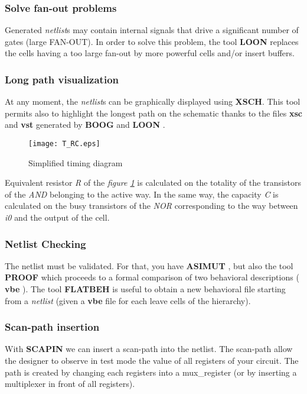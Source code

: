 \documentclass{article}
\begin{document}
{\subsubsection{Solve fan-out problems }
    Generated { \it netlist}\/s may contain internal signals that drive a
    significant number of gates (large FAN-OUT).
    In order to solve this problem, the tool
    { \bf LOON } replaces the cells having a too large fan-out by more powerful
    cells and/or insert buffers.

\subsubsection{Long path visualization }
    At any moment, the { \it netlist}\/s can be graphically displayed using {\bf XSCH}.
This tool permits also to highlight the longest path on the schematic thanks to the files { \bf
xsc } and { \bf vst } generated by { \bf BOOG } and { \bf LOON }.

\begin{figure}[H]\centering
  \texttt{[image: T\_RC.eps]}
 \caption{Simplified timing diagram }
  \label{Fig:T_RC}
\end{figure}

Equivalent resistor { \it R } of the { \it figure \ref{Fig:T_RC} }
is calculated on the totality of the transistors of the { \it AND
} belonging to the active way. In the same way, the capacity { \it
C } is calculated on the busy transistors of the { \it NOR }
corresponding to the way between { \it i0 } and the output of the
cell.

\subsubsection{Netlist Checking}
    The netlist must be validated. For that, you have { \bf ASIMUT },
    but also the tool { \bf PROOF } which proceeds to a formal comparison of two behavioral
    descriptions ({ \bf vbe }). The tool { \bf FLATBEH } is useful to obtain a
    new behavioral file starting from a { \it netlist } 
   (given a {\bf vbe} file for each leave cells of the hierarchy).

\subsubsection{Scan-path insertion}
    With { \bf SCAPIN } we can insert a scan-path into the netlist.
    The scan-path allow the designer to observe in test mode the value of all registers of your circuit. 
    The path is created by changing each registers into a mux\_register (or by inserting a multiplexer
    in front of all registers).

}
\end{document}
